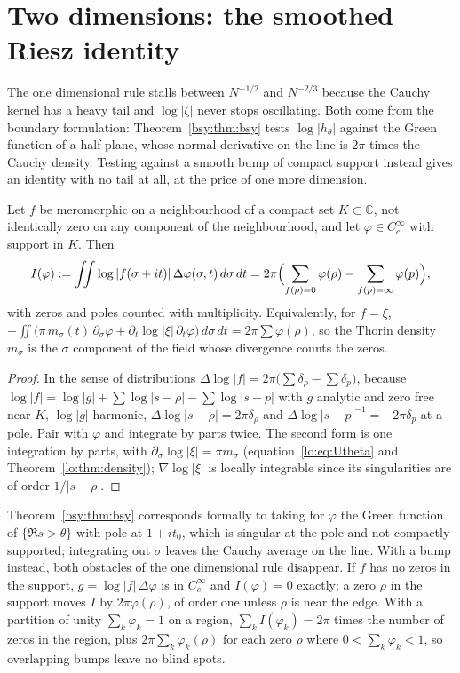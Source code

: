 \section{Two dimensions: the smoothed Riesz identity}\label{bsy:sec:2d}

The one dimensional rule stalls between $N^{-1/2}$ and $N^{-2/3}$ because the Cauchy kernel has a heavy tail and $\log|\zeta|$ never stops oscillating. Both come from the boundary formulation: Theorem~\ref{bsy:thm:bsy} tests $\log|h_\theta|$ against the Green function of a half plane, whose normal derivative on the line is $2\pi$ times the Cauchy density. Testing against a smooth bump of compact support instead gives an identity with no tail at all, at the price of one more dimension.

\begin{theorem}\label{bsy:thm:riesz2d}
Let $f$ be meromorphic on a neighbourhood of a compact set $K\subset\mathbb{C}$, not identically zero on any component of the neighbourhood, and let $\varphi\in C_c^\infty$ with support in $K$. Then
\[
I(\varphi):=\iint\log|f(\sigma+it)|\,\Delta\varphi(\sigma,t)\,d\sigma\,dt=2\pi\Bigl(\sum_{f(\rho)=0}\varphi(\rho)-\sum_{f(p)=\infty}\varphi(p)\Bigr),
\]
with zeros and poles counted with multiplicity. Equivalently, for $f=\xi$,
$-\iint\bigl(\pi\,m_\sigma(t)\,\partial_\sigma\varphi+\partial_t\log|\xi|\,\partial_t\varphi\bigr)\,d\sigma\,dt=2\pi\sum\varphi(\rho)$, so the Thorin density $m_\sigma$ is the $\sigma$ component of the field whose divergence counts the zeros.
\end{theorem}

\begin{proof}
In the sense of distributions $\Delta\log|f|=2\pi\bigl(\sum\delta_\rho-\sum\delta_p\bigr)$, because $\log|f|=\log|g|+\sum\log|s-\rho|-\sum\log|s-p|$ with $g$ analytic and zero free near $K$, $\log|g|$ harmonic, $\Delta\log|s-\rho|=2\pi\delta_\rho$ and $\Delta\log|s-p|^{-1}=-2\pi\delta_p$ at a pole. Pair with $\varphi$ and integrate by parts twice. The second form is one integration by parts, with $\partial_\sigma\log|\xi|=\pi m_\sigma$ (equation~\eqref{lo:eq:Utheta} and Theorem~\ref{lo:thm:density}); $\nabla\log|\xi|$ is locally integrable since its singularities are of order $1/|s-\rho|$.
\end{proof}

Theorem~\ref{bsy:thm:bsy} corresponds formally to taking for $\varphi$ the Green function of $\{\Re s>\theta\}$ with pole at $1+it_0$, which is singular at the pole and not compactly supported; integrating out $\sigma$ leaves the Cauchy average on the line. With a bump instead, both obstacles of the one dimensional rule disappear. If $f$ has no zeros in the support, $g=\log|f|\,\Delta\varphi$ is in $C_c^\infty$ and $I(\varphi)=0$ exactly; a zero $\rho$ in the support moves $I$ by $2\pi\varphi(\rho)$, of order one unless $\rho$ is near the edge. With a partition of unity $\sum_k\varphi_k=1$ on a region, $\sum_kI(\varphi_k)=2\pi$ times the number of zeros in the region, plus $2\pi\sum_k\varphi_k(\rho)$ for each zero $\rho$ where $0<\sum_k\varphi_k<1$, so overlapping bumps leave no blind spots.

